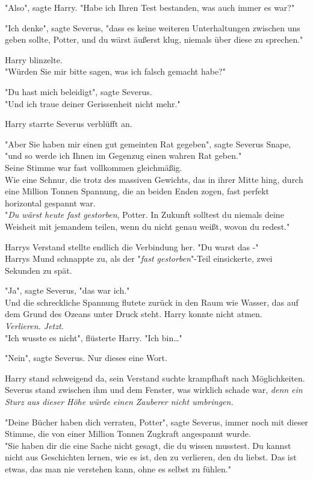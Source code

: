 {"Also", sagte Harry. "Habe ich Ihren Test bestanden, was auch immer es war?"

"Ich denke", sagte Severus, "dass es keine weiteren Unterhaltungen zwischen uns geben sollte, Potter, und du wärst äußerst klug, niemals über diese zu sprechen."

Harry blinzelte.\\ "Würden Sie mir bitte sagen, was ich falsch gemacht habe?"

"Du hast mich beleidigt", sagte Severus.\\ "Und ich traue deiner Gerissenheit nicht mehr."

Harry starrte Severus verblüfft an.

"Aber Sie haben mir einen gut gemeinten Rat gegeben", sagte Severus Snape,\\ "und so werde ich Ihnen im Gegenzug einen wahren Rat geben."\\ Seine Stimme war fast vollkommen gleichmäßig.\\ Wie eine Schnur, die trotz des massiven Gewichts, das in ihrer Mitte hing, durch eine Million Tonnen Spannung, die an beiden Enden zogen, fast perfekt horizontal gespannt war.\\ "\emph{Du wärst heute fast gestorben}, Potter. In Zukunft solltest du niemals deine Weisheit mit jemandem teilen, wenn du nicht genau weißt, wovon du redest."

Harrys Verstand stellte endlich die Verbindung her. "Du warst das -"\\ Harrys Mund schnappte zu, als der "\emph{fast gestorben}"-Teil einsickerte, zwei Sekunden zu spät.

"Ja", sagte Severus, "das war ich."\\ Und die schreckliche Spannung flutete zurück in den Raum wie Wasser, das auf dem Grund des Ozeans unter Druck steht. Harry konnte nicht atmen.\\ \emph{Verlieren. Jetzt}.\\ "Ich wusste es nicht", flüsterte Harry. "Ich bin…"

"Nein", sagte Severus. Nur dieses eine Wort.

Harry stand schweigend da, sein Verstand suchte krampfhaft nach Möglichkeiten.\\ Severus stand zwischen ihm und dem Fenster, was wirklich schade war, \emph{denn ein Sturz aus dieser Höhe würde einen Zauberer nicht umbringen.}

"Deine Bücher haben dich verraten, Potter", sagte Severus, immer noch mit dieser Stimme, die von einer Million Tonnen Zugkraft angespannt wurde.\\ "Sie haben dir die eine Sache nicht gesagt, die du wissen musstest. Du kannst nicht aus Geschichten lernen, wie es ist, den zu verlieren, den du liebst. Das ist etwas, das man nie verstehen kann, ohne es selbst zu fühlen."

}
